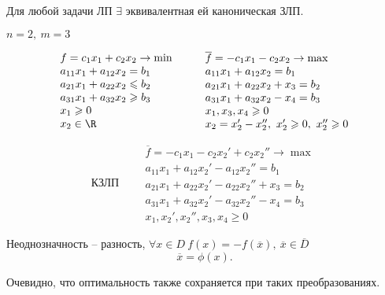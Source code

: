 \begin{theorem}
	Для любой задачи ЛП $\exists $ эквивалентная ей каноническая ЗЛП.
\end{theorem}

\begin{note}
	$n=2, \ m = 3$

	\[
		\begin{array}{l}
			f = c_1x_1 + c_2x_2 \rightarrow \min   \\
			a_{11} x_1 + a_{12} x_2 = b_1          \\
			a_{21} x_1 + a_{22} x_2 \leqslant b_2  \\
			a_{31} x_1 + a_{32}  x_2 \geqslant b_3 \\
			x_1 \geqslant 0                        \\
			x_2 \in \R
		\end{array} \qquad \begin{array}{l}
			\overline{f} = -c_1x_1 - c_2x_2 \rightarrow \max \\
			a_{11} x_1 + a_{12} x_2 = b_1                    \\
			a_{21} x_1 + a_{22} x_2 + x_3 = b_2              \\
			a_{31} x_1 + a_{32} x_2 - x_4 = b_3              \\
			x_1,x_3,x_4 \geqslant 0                          \\
			x_2 = x_{2}' - x_{2}'', \ x_{2}' \geqslant 0, \ x_{2}'' \geqslant 0
		\end{array}
	\]

	\[
		\text{КЗЛП} \qquad \begin{array}{l}
			\overline{f}  = -c_1x_1 - c_2x_2 ' + c_2 x_2 '' \rightarrow \max \\
			a_{11} x_1 + a_{12} x_2 ' - a_{12} x_2 '' = b_1                  \\
			a_{21} x_1 + a_{22} x_2 ' - a_{22} x_2 '' + x_3 = b_2            \\
			a_{31} x_1 + a_{32} x_2 ' - a_{32} x_2 '' - x_4 = b_3            \\
			x_1,x_2 ', x_2 '', x_3,x_4 \geqslant 0
		\end{array}
	\]

	Неоднозначность -- разность, $\forall x \in D \ f(x) = -f(\overline{x} ), \ \overline{x}  \in \overline{D} $
	\[
		\overline{x} = \phi (x).
	\]

	Очевидно, что оптимальность также сохраняется при таких преобразованиях.
\end{note}

